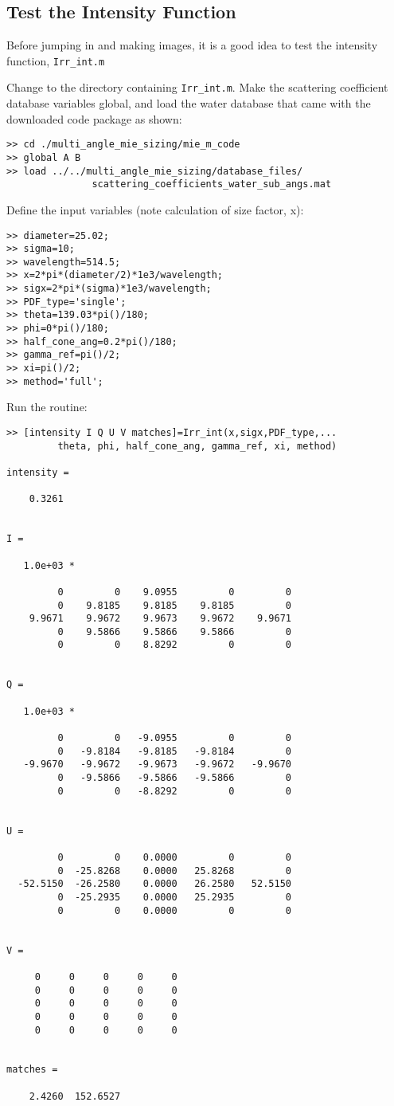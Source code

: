 \subsection{Test the Intensity Function}
Before jumping in and making images, it is a good idea to test the intensity function, \texttt{Irr\_int.m}

Change to the directory containing \texttt{Irr\_int.m}.  Make the scattering coefficient database variables global, and load the water database that came with the downloaded code package as shown:

\begin{verbatim}
>> cd ./multi_angle_mie_sizing/mie_m_code
>> global A B
>> load ../../multi_angle_mie_sizing/database_files/
               scattering_coefficients_water_sub_angs.mat
\end{verbatim}
Define the input variables (note calculation of size factor, x):
\begin{verbatim}
>> diameter=25.02;
>> sigma=10;
>> wavelength=514.5;
>> x=2*pi*(diameter/2)*1e3/wavelength;
>> sigx=2*pi*(sigma)*1e3/wavelength;
>> PDF_type='single';
>> theta=139.03*pi()/180;
>> phi=0*pi()/180;
>> half_cone_ang=0.2*pi()/180;
>> gamma_ref=pi()/2;
>> xi=pi()/2;
>> method='full';
\end{verbatim}
Run the routine:
\begin{verbatim}
>> [intensity I Q U V matches]=Irr_int(x,sigx,PDF_type,...
         theta, phi, half_cone_ang, gamma_ref, xi, method)

intensity =

    0.3261


I =

   1.0e+03 *

         0         0    9.0955         0         0
         0    9.8185    9.8185    9.8185         0
    9.9671    9.9672    9.9673    9.9672    9.9671
         0    9.5866    9.5866    9.5866         0
         0         0    8.8292         0         0


Q =

   1.0e+03 *

         0         0   -9.0955         0         0
         0   -9.8184   -9.8185   -9.8184         0
   -9.9670   -9.9672   -9.9673   -9.9672   -9.9670
         0   -9.5866   -9.5866   -9.5866         0
         0         0   -8.8292         0         0


U =

         0         0    0.0000         0         0
         0  -25.8268    0.0000   25.8268         0
  -52.5150  -26.2580    0.0000   26.2580   52.5150
         0  -25.2935    0.0000   25.2935         0
         0         0    0.0000         0         0


V =

     0     0     0     0     0
     0     0     0     0     0
     0     0     0     0     0
     0     0     0     0     0
     0     0     0     0     0


matches =

    2.4260  152.6527

\end{verbatim}

